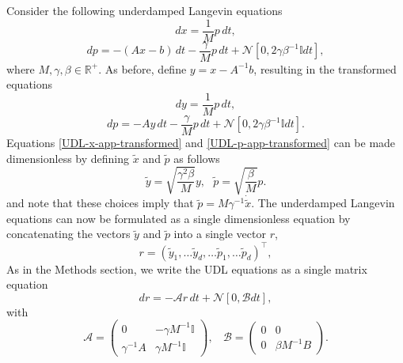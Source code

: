 \documentclass[prx,onecolumn,floatfix,longbibliography,notitlepage, nofootinbib,12pt]{revtex4-2}
\begin{document}
\begin{appendix}
Consider the following underdamped Langevin equations
\begin{equation}
\label{UDL-x-app}
    dx  = \frac{1}{M} p \, dt,
\end{equation}
\begin{equation}
\label{UDL-p-app}
    dp = -(A x - b) \, dt- \frac{\gamma}{M} p \, dt + \mathcal{N}[0,2 \gamma \beta^{-1}  \mathbb{I} dt],
\end{equation}
where $M, \gamma, \beta \in \mathbb{R}^+$. As before, define $y = x - A^{-1} b$, resulting in the transformed equations
\begin{equation}
\label{UDL-x-app-transformed}
    dy  = \frac{1}{M} p \, dt,
\end{equation}
\begin{equation}
\label{UDL-p-app-transformed}
    dp = -A y \, dt- \frac{\gamma}{M}p \, dt + \mathcal{N}[0,2 \gamma \beta^{-1} \mathbb{I} dt].
\end{equation}
Equations \eqref{UDL-x-app-transformed} and \eqref{UDL-p-app-transformed} can be made dimensionless by defining $\tilde{x}$ and $\tilde{p}$ as follows
\begin{equation}
    \tilde{y} =\sqrt{\frac{\gamma^2 \beta}{M}}y, \: \: \: \tilde{p} = \sqrt{\frac{\beta}{M}}p.
\end{equation}
and note that these choices imply that $\tilde{p} = M \gamma^{-1} \dot{\tilde{x}}$. The underdamped Langevin equations can now be formulated as a single dimensionless equation by concatenating the vectors $\tilde{y}$ and $\tilde{p}$ into a single vector $r$,
\begin{equation}
\label{r-def-app}
    r = \left(\tilde{y}_1, \dots \tilde{y}_d, \dots \tilde{p}_1, \dots \tilde{p}_d\right)^\intercal,
\end{equation}
As in the Methods section, we write the UDL equations as a single matrix equation
\begin{equation}
    dr = -\mathcal{A} r\, dt + \mathcal{N}[0, \mathcal{B} dt],
\end{equation}
with
\begin{equation}
    \mathcal{A} = \begin{pmatrix}
    0 & -\gamma M^{-1}\mathbb{I} \\
    \gamma^{-1}A & \gamma M^{-1} \mathbb{I}
    \end{pmatrix}, \: \: \: \:
    \mathcal{B} = \begin{pmatrix}
    0 & 0  \\
    0 & \beta M^{-1} B
    \end{pmatrix}.

\end{equation}
\end{appendix}
\end{document}
